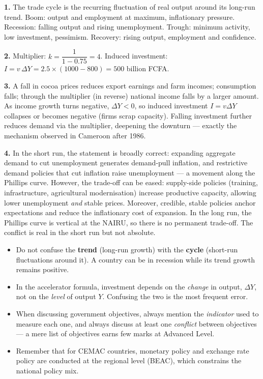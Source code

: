 \documentclass[11pt]{article}
\begin{document}
\begin{corrige}[Exercise 5]
\textbf{1.} The trade cycle is the recurring fluctuation of real output around its long-run trend. Boom: output and employment at maximum, inflationary pressure. Recession: falling output and rising unemployment. Trough: minimum activity, low investment, pessimism. Recovery: rising output, employment and confidence.

\textbf{2.} Multiplier: $k = \dfrac{1}{1 - 0.75} = 4$. Induced investment: $I = v\,\Delta Y = 2.5 \times (1000 - 800) = 500$ billion FCFA.

\textbf{3.} A fall in cocoa prices reduces export earnings and farm incomes; consumption falls; through the multiplier (in reverse) national income falls by a larger amount. As income growth turns negative, $\Delta Y < 0$, so induced investment $I = v\Delta Y$ collapses or becomes negative (firms scrap capacity). Falling investment further reduces demand via the multiplier, deepening the downturn --- exactly the mechanism observed in Cameroon after 1986.

\textbf{4.} In the short run, the statement is broadly correct: expanding aggregate demand to cut unemployment generates demand-pull inflation, and restrictive demand policies that cut inflation raise unemployment --- a movement along the Phillips curve. However, the trade-off can be eased: supply-side policies (training, infrastructure, agricultural modernisation) increase productive capacity, allowing lower unemployment \emph{and} stable prices. Moreover, credible, stable policies anchor expectations and reduce the inflationary cost of expansion. In the long run, the Phillips curve is vertical at the NAIRU, so there is no permanent trade-off. The conflict is real in the short run but not absolute.
\end{corrige}

\begin{attention}
\begin{itemize}
\item Do not confuse the \textbf{trend} (long-run growth) with the \textbf{cycle} (short-run fluctuations around it). A country can be in recession while its trend growth remains positive.
\item In the accelerator formula, investment depends on the \emph{change} in output, $\Delta Y$, not on the \emph{level} of output $Y$. Confusing the two is the most frequent error.
\item When discussing government objectives, always mention the \emph{indicator} used to measure each one, and always discuss at least one \emph{conflict} between objectives --- a mere list of objectives earns few marks at Advanced Level.
\item Remember that for CEMAC countries, monetary policy and exchange rate policy are conducted at the regional level (BEAC), which constrains the national policy mix.
\end{itemize}
\end{attention}
\end{document}

